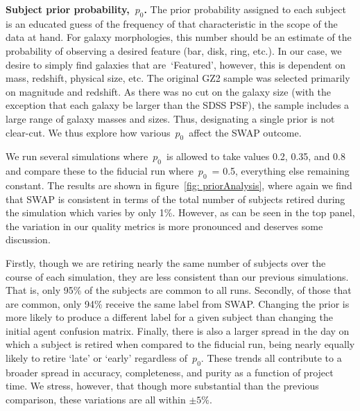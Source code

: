 \documentclass[twocolumn]{aastex6}
\newcommand{\p}{$p_0$}
\newcommand{\feat}{`Featured'}
\begin{document}
\textbf{Subject prior probability,~\p.}
The prior probability assigned to each subject is an educated guess of 
the frequency of that characteristic in the scope of the data at hand. 
For galaxy morphologies, this number should be an estimate of the probability
of observing a desired feature (bar, disk, ring, etc.). In our case, 
we desire to simply find galaxies that are~\feat, however, this is dependent 
on mass, redshift, physical size, etc. The original GZ2 sample was selected
primarily on magnitude and redshift.  As there was no cut on the galaxy size
(with the exception that each galaxy be larger than the SDSS PSF), the sample
includes a large range of galaxy masses and sizes. Thus, designating a single 
prior is not clear-cut. We thus explore how various~\p~affect the SWAP outcome.

We run several simulations where~\p~is allowed to take values 0.2, 0.35, and 0.8 
and compare these to the fiducial run where~\p~= 0.5, everything else remaining constant.
The results are shown in figure~\ref{fig: priorAnalysis}, where again we find that 
SWAP is consistent in terms of the total number of subjects retired 
during the simulation which varies by only 1\%. 
However, as can be seen in the top panel, the variation in our quality metrics is 
more pronounced and deserves some discussion. 

Firstly, though we are retiring nearly the same number of subjects over the course
of each simulation, they are less consistent than our previous simulations. That is, 
only 95\% of the subjects are common to all runs. Secondly, of those that are 
common, only 94\% receive the same label from SWAP. Changing the prior is more
likely to produce a different label for a given subject than changing the initial 
agent confusion matrix. Finally, there is also a larger spread in the day on which 
a subject is retired when compared to the fiducial run, being nearly equally likely to 
retire `late' or `early' regardless of~\p. These trends all contribute to a broader 
spread in accuracy, completeness, and purity as a function of project time.
We stress, however, that though more substantial than the previous comparison, 
these variations are all within $\pm5\%$. 
\end{document}
